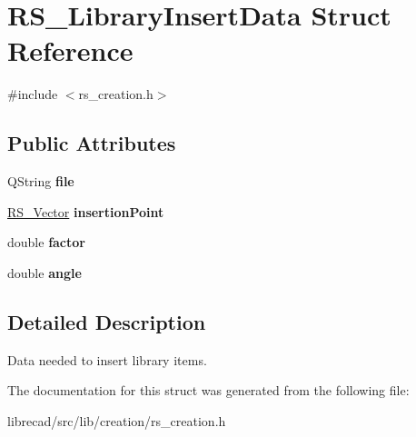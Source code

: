 \hypertarget{structRS__LibraryInsertData}{\section{R\-S\-\_\-\-Library\-Insert\-Data Struct Reference}
\label{structRS__LibraryInsertData}
}


{\ttfamily \#include $<$rs\-\_\-creation.\-h$>$}

\subsection*{Public Attributes}
\begin{DoxyCompactItemize}
\item 
\hypertarget{structRS__LibraryInsertData_af622b0af6762ec2c98fa8e2d03c73fb9}{Q\-String {\bfseries file}}\label{structRS__LibraryInsertData_af622b0af6762ec2c98fa8e2d03c73fb9}

\item 
\hypertarget{structRS__LibraryInsertData_a6b5b501e3aa2abfd97761942d3321195}{\hyperlink{classRS__Vector}{R\-S\-\_\-\-Vector} {\bfseries insertion\-Point}}\label{structRS__LibraryInsertData_a6b5b501e3aa2abfd97761942d3321195}

\item 
\hypertarget{structRS__LibraryInsertData_a0205086c6d4b37f0667573aed64ee8f9}{double {\bfseries factor}}\label{structRS__LibraryInsertData_a0205086c6d4b37f0667573aed64ee8f9}

\item 
\hypertarget{structRS__LibraryInsertData_ab653e24fd41ebd8c67c195925e84a791}{double {\bfseries angle}}\label{structRS__LibraryInsertData_ab653e24fd41ebd8c67c195925e84a791}

\end{DoxyCompactItemize}


\subsection{Detailed Description}
Data needed to insert library items. 

The documentation for this struct was generated from the following file\-:\begin{DoxyCompactItemize}
\item 
librecad/src/lib/creation/rs\-\_\-creation.\-h\end{DoxyCompactItemize}
